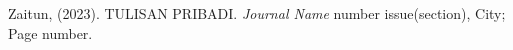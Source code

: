\begin{thebibliography}{2}
    Zaitun,				                   %
        \newblock  (2023).					       %
        \newblock TULISAN PRIBADI.			       %
        \newblock \emph{Journal Name} number issue(section),  %
        \newblock City;										  %
        \newblock Page number.								  %
    \end{thebibliography}